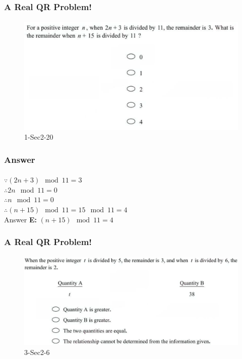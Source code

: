 \documentclass[
	11pt, %
]{beamer}
\begin{document}
\begin{frame}
	\frametitle{A Real QR Problem!}
	\framesubtitle{}
	\begin{figure}
		\includegraphics[width=\linewidth]{Remainder_Example_Question1.png}
		\caption{1-Sec2-20}
	\end{figure}

\end{frame}


\begin{frame}
	\frametitle{Answer}
	\framesubtitle{}

	$\because (2n + 3) \mod 11 = 3$ \\
	$\therefore 2n  \mod 11 = 0$ \\
	$\therefore n  \mod 11 = 0$ \\
	$\therefore (n + 15) \mod 11 = 15 \mod 11 = 4$ \\
\pause
\bigskip
Answer \textbf{E: } $ (n + 15) \mod 11 = 4$
\end{frame}


\begin{frame}
	\frametitle{A Real QR Problem!}
	\framesubtitle{}
	\begin{figure}
		\includegraphics[width=\linewidth]{Remainder_Example_Question2.png}
		\caption{3-Sec2-6}
		\end{figure}
\end{frame}
\end{document}
